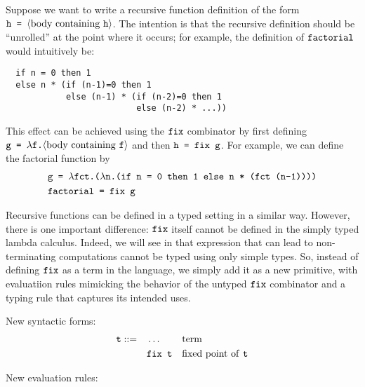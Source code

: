 \documentclass[11pt,twoside=off,numbers=noenddot]{scrbook}
\begin{document}
Suppose we want to write a recursive function definition of the form
$\ttt{h = $\langle$\textnormal{body containing }h$\rangle$}$. The
intention is that the recursive definition should be ``unrolled'' at
the point where it occurs; for example, the definition of
$\ttt{factorial}$ would intuitively be:
\begin{verbatim}
  if n = 0 then 1
  else n * (if (n-1)=0 then 1
            else (n-1) * (if (n-2)=0 then 1
                          else (n-2) * ...))
\end{verbatim}
This effect can be achieved using the $\ttt{fix}$ combinator by first
defining $\ttt{g = $\lambda$f.$\langle$\textnormal{body containing
}f$\rangle$}$ and then $\ttt{h = fix g}$. For example, we can define
the factorial function by
\begin{align*}
  & \ttt{g = $\lambda$fct.($\lambda$n.(if n = 0 then 1 else n * (fct
  (n-1))))} \\
  & \ttt{factorial = fix g}
\end{align*}

Recursive functions can be defined in a typed setting in a similar
way. However, there is one important difference: $\ttt{fix}$ itself
cannot be defined in the simply typed lambda calculus. Indeed, we
will see in  that expression that can lead to
non-terminating computations cannot be typed using only simple types.
So, instead of defining $\ttt{fix}$ as a term in the language, we
simply add it as a new primitive, with evaluatiion rules mimicking
the behavior of the untyped $\ttt{fix}$ combinator and a typing rule
that captures its intended uses.

New syntactic forms:
\begin{align*}
  \ttt{t} ::= & \quad \dots && \text{term} \\
  & \quad \ttt{fix t} && \text{fixed point of \ttt{t}}
\end{align*}

New evaluation rules:
\begin{prooftree}
\end{prooftree}

\begin{prooftree}
\end{prooftree}
\end{document}
